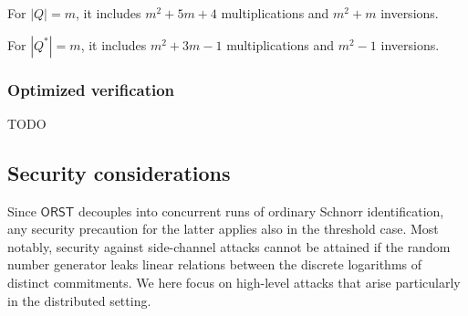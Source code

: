 \documentclass[psamsfonts, reqno]{amsart}
\theoremstyle{definition}
\theoremstyle{remark}
\numberwithin{equation}{section}
\begin{document}

For $|Q| = m$, it includes
$m^2 + 5m + 4$ multiplications and
$m^2 + m$ inversions.

For $|Q^*| = m$, it includes
$m^2 + 3m - 1$ multiplications and
$m^2 -1$ inversions.

\subsubsection{Optimized verification}\label{section_optimized_verification}
TODO

\subsection{Security considerations}

Since $$
decouples into concurrent runs
of ordinary Schnorr identification, any security precaution
for the latter applies also in the threshold case.
Most notably, security against side-channel attacks
cannot be attained if the random number generator
leaks linear relations between the discrete logarithms
of distinct commitments.
We here focus on high-level attacks that
arise particularly in the distributed setting.
\end{document}
